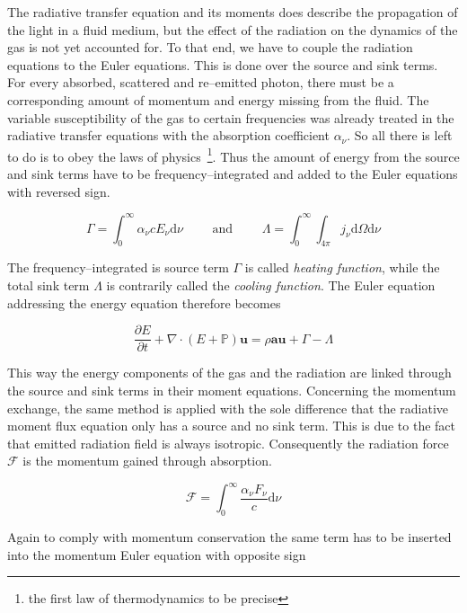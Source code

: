 The radiative transfer equation and its moments does describe the propagation of the light in a fluid medium, but the effect of the radiation on the dynamics of the gas is not yet accounted for.
To that end, we have to couple the radiation equations to the Euler equations.
This is done over the source and sink terms.
For every absorbed, scattered and re--emitted photon, there must be a corresponding amount of momentum and energy missing from the fluid.
The variable susceptibility of the gas to certain frequencies was already treated in the radiative transfer equations with the absorption coefficient $\alpha_{\nu}$.
So all there is left to do is to obey the laws of physics~\footnote{the first law of thermodynamics to be precise}.
Thus the amount of energy from the source and sink terms have to be frequency--integrated and added to the Euler equations with reversed sign.

\begin{equation}
  \Gamma = \int_{0}^{\infty}\alpha_{\nu}cE_{\nu}\mathrm{d}\nu \qquad\text{ and }\qquad \Lambda = \int_{0}^{\infty}\int_{4\pi}j_{\nu}\mathrm{d}\Omega\mathrm{d}\nu
\end{equation}

The frequency--integrated is source term $\Gamma$ is called \textit{heating function}, while the total sink term $\Lambda$ is contrarily called the \textit{cooling function}.
The Euler equation addressing the energy equation therefore becomes

\begin{equation}
  \frac{\partial E}{\partial t} + \nabla \cdot (E + \mathbb{P}) \textbf{u} = \rho \textbf{a} \textbf{u} + \Gamma - \Lambda
\end{equation}

This way the energy components of the gas and the radiation are linked through the source and sink terms in their moment equations.
Concerning the momentum exchange, the same method is applied with the sole difference that the radiative moment flux equation only has a source and no sink term.
This is due to the fact that emitted radiation field is always isotropic.
Consequently the radiation force $\mathcal{F}$ is the momentum gained through absorption.

\begin{equation}
  \mathcal{F} = \int_{0}^{\infty}\frac{\alpha_{\nu}F_{\nu}}{c}\mathrm{d}\nu
\end{equation}

Again to comply with momentum conservation the same term has to be inserted into the momentum Euler equation with opposite sign

